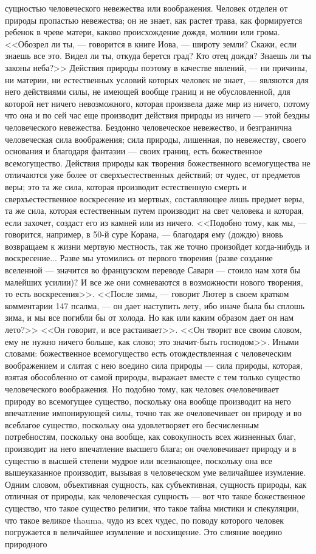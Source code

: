 \documentclass[12pt]{article}
\begin{document}
сущностью человеческого невежества или воображения. Человек отделен от природы пропастью невежества; он не знает, как растет трава, как формируется ребенок в чреве матери, каково происхождение дождя, молнии или грома. <<Обозрел ли ты, --- говорится в книге Иова, --- широту земли? Скажи, если знаешь все это. Видел ли ты, откуда берется град? Кто отец дождя? Знаешь ли ты законы неба?>> Действия природы поэтому в качестве явлений, --- ни причины, ни материи, ни естественных условий которых человек не знает, --- являются для него действиями силы, не имеющей вообще границ и не обусловленной, для которой нет ничего невозможного, которая произвела даже мир из ничего, потому что она и по сей час еще производит действия природы из ничего --- этой бездны человеческого невежества. Бездонно человеческое невежество, и безгранична человеческая сила воображения; сила природы, лишенная, по невежеству, своего основания и благодаря фантазии --- своих границ, есть божественное всемогущество. Действия природы как творения божественного всемогущества не отличаются уже более от сверхъестественных действий; от чудес, от предметов веры; это та же сила, которая производит естественную смерть и сверхъестественное воскресение из мертвых, составляющее лишь предмет веры, та же сила, которая естественным путем производит на свет человека и которая, если захочет, создаст его из камней или из ничего. <<Подобно тому, как мы, --- говорится, например, в 50-й суре Корана, --- благодаря ему (дождю) вновь возвращаем к жизни мертвую местность, так же точно произойдет когда-нибудь и воскресение... Разве мы утомились от первого творения (разве создание вселенной --- значится во французском переводе Савари --- стоило нам хотя бы малейших усилии)? И все же они сомневаются в возможности нового творения, то есть воскресения>>. <<После зимы, --- говорит Лютер в своем кратком комментарии 147 псалма, --- он дает наступить лету, ибо иначе была бы сплошь зима, и мы все погибли бы от холода. Но как или каким образом дает он нам лето?>> <<Он говорит, и все растаивает>>. <<Он творит все своим словом, ему не нужно ничего больше, как слово; это значит-быть господом>>. Иными словами: божественное всемогущество есть отождествленная с человеческим воображением и слитая с нею воедино сила природы --- сила природы, которая, взятая обособленно от самой природы, выражает вместе с тем только существо человеческого воображения. Но подобно тому, как человек очеловечивает природу во всемогущее существо, поскольку она вообще производит на него впечатление импонирующей силы, точно так же очеловечивает он природу и во всеблагое существо, поскольку она удовлетворяет его бесчисленным потребностям, поскольку она вообще, как совокупность всех жизненных благ, производит на него впечатление высшего блага; он очеловечивает природу и в существо в высшей степени мудрое или всезнающее, поскольку она все вышеуказанное производит, вызывая в человеческом уме величайшее изумление. Одним словом, объективная сущность, как субъективная, сущность природы, как отличная от природы, как человеческая сущность --- вот что такое божественное существо, что такое существо религии, что такое тайна мистики и спекуляции, что такое великое thauma, чудо из всех чудес, по поводу которого человек погружается в величайшее изумление и восхищение. Это слияние воедино природного 
\end{document}
